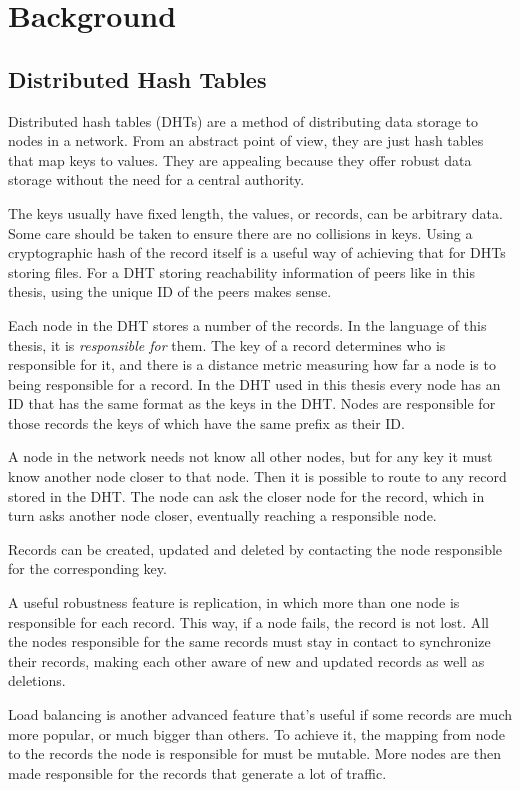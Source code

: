 \chapter{Background}
\label{chap:background}
\section{Distributed Hash Tables}
\label{sec:background_dhts}
Distributed hash tables (DHTs) are a method of distributing data storage to
nodes in a network. From an abstract point of view, they are just hash tables
that map keys to values. They are appealing because they offer robust data
storage without the need for a central authority.

The keys usually have fixed length, the values, or records, can be arbitrary
data. Some care should be taken to ensure there are no collisions in keys. Using
a cryptographic hash of the record itself is a useful way of achieving that for
DHTs storing files. For a DHT storing reachability information of peers like in
this thesis, using the unique ID of the peers makes sense.

Each node in the DHT stores a number of the records. In the language of this
thesis, it is \emph{responsible for} them. The key of a record determines who is
responsible for it, and there is a distance metric measuring how far a node is
to being responsible for a record. In the DHT used in this thesis every node has
an ID that has the same format as the keys in the DHT. Nodes are responsible for
those records the keys of which have the same prefix as their ID.

A node in the network needs not know all other nodes, but for any key it must
know another node closer to that node. Then it is possible to route to any
record stored in the DHT. The node can ask the closer node for the record, which
in turn asks another node closer, eventually reaching a responsible node.

Records can be created, updated and deleted by contacting the node responsible
for the corresponding key.

A useful robustness feature is replication, in which more than one node is
responsible for each record. This way, if a node fails, the record is not lost.
All the nodes responsible for the same records must stay in contact to
synchronize their records, making each other aware of new and updated records as
well as deletions.

Load balancing is another advanced feature that's useful if some records are
much more popular, or much bigger than others. To achieve it, the mapping from
node to the records the node is responsible for must be mutable. More nodes are
then made responsible for the records that generate a lot of traffic.

